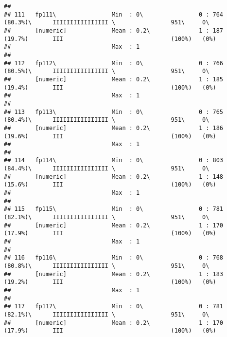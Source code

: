 \documentclass[]{article}
\begin{document}
\begin{verbatim}
## 
## 111   fp111\                Min  : 0\                0 : 764 (80.3%)\      IIIIIIIIIIIIIIII \                951\     0\       
##       [numeric]             Mean : 0.2\              1 : 187 (19.7%)       III                               (100%)   (0%)     
##                             Max  : 1                                                                                           
## 
## 112   fp112\                Min  : 0\                0 : 766 (80.5%)\      IIIIIIIIIIIIIIII \                951\     0\       
##       [numeric]             Mean : 0.2\              1 : 185 (19.4%)       III                               (100%)   (0%)     
##                             Max  : 1                                                                                           
## 
## 113   fp113\                Min  : 0\                0 : 765 (80.4%)\      IIIIIIIIIIIIIIII \                951\     0\       
##       [numeric]             Mean : 0.2\              1 : 186 (19.6%)       III                               (100%)   (0%)     
##                             Max  : 1                                                                                           
## 
## 114   fp114\                Min  : 0\                0 : 803 (84.4%)\      IIIIIIIIIIIIIIII \                951\     0\       
##       [numeric]             Mean : 0.2\              1 : 148 (15.6%)       III                               (100%)   (0%)     
##                             Max  : 1                                                                                           
## 
## 115   fp115\                Min  : 0\                0 : 781 (82.1%)\      IIIIIIIIIIIIIIII \                951\     0\       
##       [numeric]             Mean : 0.2\              1 : 170 (17.9%)       III                               (100%)   (0%)     
##                             Max  : 1                                                                                           
## 
## 116   fp116\                Min  : 0\                0 : 768 (80.8%)\      IIIIIIIIIIIIIIII \                951\     0\       
##       [numeric]             Mean : 0.2\              1 : 183 (19.2%)       III                               (100%)   (0%)     
##                             Max  : 1                                                                                           
## 
## 117   fp117\                Min  : 0\                0 : 781 (82.1%)\      IIIIIIIIIIIIIIII \                951\     0\       
##       [numeric]             Mean : 0.2\              1 : 170 (17.9%)       III                               (100%)   (0%)     

\end{verbatim}
\end{document}
